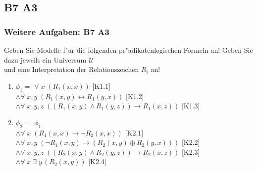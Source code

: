 \subsection{B7 A3}
\begin{frame}
	\frametitle{Weitere Aufgaben: B7 A3}
	Geben Sie Modelle f"ur die folgenden pr"adikatenlogischen Formeln an! Geben Sie dazu
	jeweils ein Universum $\mathcal{U}$\\
	und eine Interpretation der Relationszeichen $R_i$ an!
	\begin{enumerate}
		\item $\phi_1 =$ \hspace*{0.2cm} $\forall \; x \; (R_1(x,x))$ \hspace*{5.3cm}[K1.1]\\
		\hspace*{0.85cm} $\wedge \forall \; x,y \; (R_1(x,y) \leftrightarrow R_1(y,x))$
		\hspace*{3.2cm} [K1.2]\\
		\hspace*{0.85cm} $\wedge \forall \; x,y,z \; ((R_1(x,y) \wedge R_1(y,z)) \rightarrow
		R_1(x,z))$ \hspace*{1cm} [K1.3]
		\item $\phi_2 =$ \hspace*{0.2cm} $\phi_1$\\
		\hspace*{0.85cm} $\wedge \forall \; x \; (R_1(x,x) \rightarrow \neg R_2(x,x))$
		\hspace*{3.25cm} [K2.1]\\
		\hspace*{0.85cm} $\wedge \forall \; x,y \; (\neg R_1(x,y) \rightarrow (R_2(x,y)
		\oplus R_2(y,x)))$ \hspace*{1cm} [K2.2]\\
		\hspace*{0.85cm} $\wedge \forall \; x,y,z \; ((R_2(x,y) \wedge R_2(y,z)) \rightarrow
		R_2(x,z))$ \hspace*{1cm}  [K2.3]\\
		\hspace*{0.85cm} $\wedge \forall \; x \; \exists \; y \, (R_2(x,y))$ \hspace*{4.8cm}
		[K2.4]
	\end{enumerate}
\end{frame}

